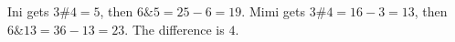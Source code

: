 Ini gets $3\#4=5$, then $6\&5=25-6=19$. Mimi gets $3\#4=16-3=13$, then $6\&13=36-13=23$. The difference is $\boxed4$.
